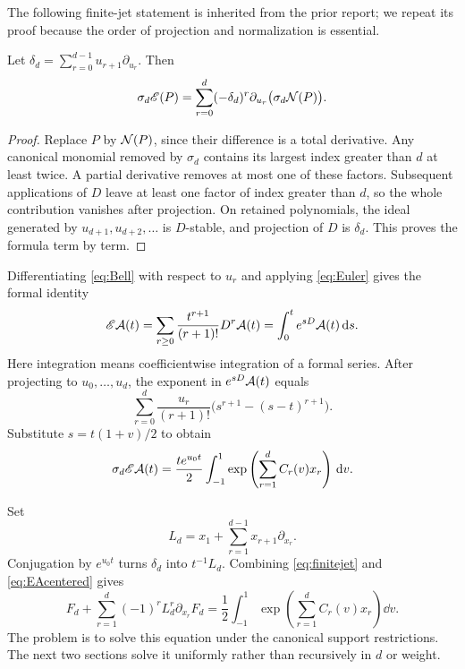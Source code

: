 The following finite-jet statement is inherited from the prior report; we repeat its proof because the order of projection and normalization is essential.

\begin{lemma}\label{lem:finitejet}
Let $\delta_d=\sum_{r=0}^{d-1}u_{r+1}\partial_{u_r}$. Then
\begin{equation}\label{eq:finitejet}
 \sigma_d\mathscr E(P)=\sum_{r=0}^d(-\delta_d)^r
                 \partial_{u_r}\bigl(\sigma_d\mathcal N(P)\bigr).
\end{equation}
\end{lemma}
\begin{proof}
Replace $P$ by $\mathcal N(P)$, since their difference is a total derivative. Any canonical monomial removed by $\sigma_d$ contains its largest index greater than $d$ at least twice. A partial derivative removes at most one of these factors. Subsequent applications of $D$ leave at least one factor of index greater than $d$, so the whole contribution vanishes after projection. On retained polynomials, the ideal generated by $u_{d+1},u_{d+2},\ldots$ is $D$-stable, and projection of $D$ is $\delta_d$. This proves the formula term by term.
\end{proof}

Differentiating \eqref{eq:Bell} with respect to $u_r$ and applying \eqref{eq:Euler} gives the formal identity
\begin{equation}\label{eq:EA}
 \mathscr E\mathcal A(t)=\sum_{r\ge0}\frac{t^{r+1}}{(r+1)!}D^r\mathcal A(t)
          =\int_0^t e^{sD}\mathcal A(t)\,\mathrm d s.
\end{equation}
Here integration means coefficientwise integration of a formal series. After projecting to $u_0,\ldots,u_d$, the exponent in $e^{sD}\mathcal A(t)$ equals
\[
 \sum_{r=0}^d\frac{u_r}{(r+1)!}
             \bigl(s^{r+1}-(s-t)^{r+1}\bigr).
\]
Substitute $s=t(1+v)/2$ to obtain
\begin{equation}\label{eq:EAcentered}
 \sigma_d\mathscr E\mathcal A(t)=\frac{te^{u_0t}}2
     \int_{-1}^1\exp\left(\sum_{r=1}^d C_r(v)x_r\right)\,\mathrm d v.
\end{equation}

Set
\begin{equation}\label{eq:Ld}
 L_d=x_1+\sum_{r=1}^{d-1}x_{r+1}\partial_{x_r}.
\end{equation}
Conjugation by $e^{u_0t}$ turns $\delta_d$ into $t^{-1}L_d$. Combining \eqref{eq:finitejet} and \eqref{eq:EAcentered} gives
\begin{equation}\label{eq:general-PDE}
 \boxed{\displaystyle
 F_d+\sum_{r=1}^d(-1)^rL_d^r\partial_{x_r}F_d
 =\frac12\int_{-1}^1\exp\left(\sum_{r=1}^dC_r(v)x_r\right)\dd v.}
\end{equation}
The problem is to solve this equation under the canonical support restrictions. The next two sections solve it uniformly rather than recursively in $d$ or weight.
